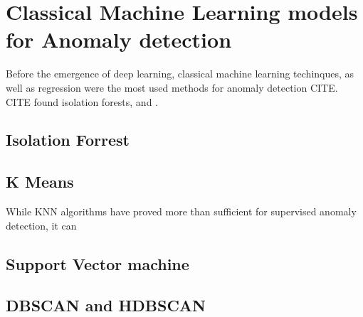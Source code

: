 \section{Classical Machine Learning models for Anomaly detection}


Before the emergence of deep learning, classical machine learning techinques, as well as regression were the most used methods for anomaly detection CITE. CITE found isolation forests, and .


\subsection{Isolation Forrest}
\subsection{K Means}

While KNN algorithms have proved more than sufficient for supervised anomaly detection, it can
\subsection{Support Vector machine}
\subsection{DBSCAN and HDBSCAN}